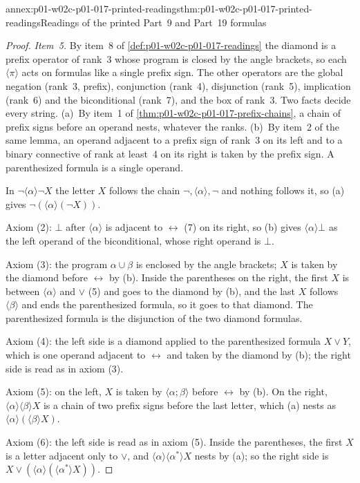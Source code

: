 \begin{annexitem}{annex:p01-w02c-p01-017-printed-readings}{thm:p01-w02c-p01-017-printed-readings}{Readings of the printed Part~9 and Part~19 formulas}
\begin{proof}
\emph{Item~5.}  By item~8 of \cref{def:p01-w02c-p01-017-readings} the
diamond is a prefix operator of rank~3 whose program is closed by the
angle brackets, so each \(\langle\pi\rangle\) acts on formulas like a
single prefix sign.  The other operators are the global negation
(rank~3, prefix), conjunction (rank~4), disjunction (rank~5),
implication (rank~6) and the biconditional (rank~7), and the box of
rank~3.  Two facts decide every string.  (a)~By item~1 of
\cref{thm:p01-w02c-p01-017-prefix-chains}, a chain of prefix signs
before an operand nests, whatever the ranks.  (b)~By item~2 of the same
lemma, an operand adjacent to a prefix sign of rank~3 on its left and to
a binary connective of rank at least~4 on its right is taken by the
prefix sign.  A parenthesized formula is a single operand.

In \(\neg\langle\alpha\rangle\neg X\) the letter \(X\) follows the chain
\(\neg,\langle\alpha\rangle,\neg\) and nothing follows it, so (a) gives
\(\neg(\langle\alpha\rangle(\neg X))\).

Axiom (2): \(\bot\) after \(\langle\alpha\rangle\) is adjacent to
\(\leftrightarrow\) (7) on its right, so (b) gives
\(\langle\alpha\rangle\bot\) as the left operand of the biconditional,
whose right operand is \(\bot\).

Axiom (3): the program \(\alpha\cup\beta\) is enclosed by the angle
brackets; \(X\) is taken by the diamond before \(\leftrightarrow\) by
(b).  Inside the parentheses on the right, the first \(X\) is between
\(\langle\alpha\rangle\) and \(\lor\) (5) and goes to the diamond by
(b), and the last \(X\) follows \(\langle\beta\rangle\) and ends the
parenthesized formula, so it goes to that diamond.  The parenthesized
formula is the disjunction of the two diamond formulas.

Axiom (4): the left side is a diamond applied to the parenthesized
formula \(X\lor Y\), which is one operand adjacent to
\(\leftrightarrow\) and taken by the diamond by (b); the right side is
read as in axiom (3).

Axiom (5): on the left, \(X\) is taken by \(\langle\alpha;\beta\rangle\)
before \(\leftrightarrow\) by (b).  On the right,
\(\langle\alpha\rangle\langle\beta\rangle X\) is a chain of two prefix
signs before the last letter, which (a) nests as
\(\langle\alpha\rangle(\langle\beta\rangle X)\).

Axiom (6): the left side is read as in axiom (5).  Inside the
parentheses, the first \(X\) is a letter adjacent only to \(\lor\), and
\(\langle\alpha\rangle\langle\alpha^{*}\rangle X\) nests by (a); so the
right side is \(X\lor(\langle\alpha\rangle(\langle\alpha^{*}\rangle X))\).


\end{proof}
\end{annexitem}
